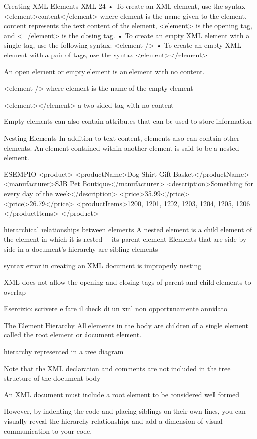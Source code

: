 Creating XML Elements
XML 24
• To create an XML element, use the syntax
<element>content</element>
where element is the name given to the element, content represents the text
content of the element, <element> is the opening tag, and <
­ /element> is the
closing tag.
• To create an empty XML element with a single tag, use the following syntax:
<element />
• To create an empty XML element with a pair of tags, use the syntax
<element></element>


An open element or empty element is an element
with no content.

<element />
where element is the name of the empty element

<element></element>
a two-sided tag with no content


Empty
elements can also contain attributes that can be used to store ­information

Nesting Elements
In addition to text content, elements also can contain other elements.
An element
contained within another element is said to be a nested element.

ESEMPIO
<product>
<productName>Dog Shirt Gift Basket</productName>
<manufacturer>SJB Pet Boutique</manufacturer>
<description>Something for every day of the week</description>
<price>35.99</price>
<price>26.79</price>
<productItems>1200, 1201, 1202, 1203, 1204, 1205, 1206
</productItems>
</product>

hierarchical relationships between
elements
A nested element is a child element of the element in which it is nested—
its parent element
Elements that are side-by-side in a document’s ­hierarchy are
sibling ­elements

syntax error in creating an XML document is improperly nesting

XML does not allow the opening and ­closing
tags of parent and child elements to overlap

Esercizio: scrivere e fare il check di un xml non opportunamente annidato

The Element Hierarchy
All elements in the body are children of a single element called the
root element or document element.

hierarchy represented in a tree diagram

Note that the XML declaration and comments are not included
in the tree structure of the document body

An XML document must include a root element to be considered well formed

However, by indenting the code and placing siblings on their own lines, you can visually
reveal the hierarchy relationships and add a dimension of visual communication to your
code.

